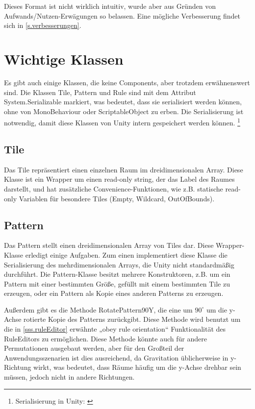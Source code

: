 Dieses Format ist nicht wirklich intuitiv, wurde aber aus Gründen von Aufwands/Nutzen-Erwägungen so belassen. Eine mögliche Verbesserung findet sich in \ref{s.verbesserungen}.

\section{Wichtige Klassen}

Es gibt auch einige Klassen, die keine Components, aber trotzdem erwähnenswert sind. Die Klassen Tile, Pattern und Rule sind mit dem Attribut System.Serializable markiert, was bedeutet, dass sie serialisiert werden können, ohne von MonoBehaviour oder ScriptableObject zu erben. Die Serialisierung ist notwendig, damit diese Klassen von Unity intern gespeichert werden können. 
\footnote{Serialisierung in Unity: \cite[Seite: script-Serialization]{unityManual}}

\subsection{Tile}

Das Tile repräsentiert einen einzelnen Raum im dreidimensionalen Array. Diese Klasse ist ein Wrapper um einen read-only string, der das Label des Raumes darstellt, und hat zusätzliche Convenience-Funktionen, wie z.B. statische read-only Variablen für besondere Tiles (Empty, Wildcard, OutOfBounds).

\subsection{Pattern}

Das Pattern stellt einen dreidimensionalen Array von Tiles dar. Diese Wrapper-Klasse erledigt einige Aufgaben. Zum einen implementiert diese Klasse die Serialisierung des mehrdimensionalen Arrays, die Unity nicht standardmäßig durchführt. Die Pattern-Klasse besitzt mehrere Konstruktoren, z.B. um ein Pattern mit einer bestimmten Größe, gefüllt mit einem bestimmten Tile zu erzeugen, oder ein Pattern als Kopie eines anderen Patterns zu erzeugen. 

Außerdem gibt es die Methode RotatePattern90Y, die eine um $ 90^\circ $ um die y-Achse rotierte Kopie des Patterns zurückgibt. Diese Methode wird benutzt um die in \ref{sss.ruleEditor} erwähnte „obey rule orientation“ Funktionalität des RuleEditors zu ermöglichen. Diese Methode könnte auch für andere Permutationen ausgebaut werden, aber für den Großteil der Anwendungsszenarien ist dies ausreichend, da Gravitation üblicherweise in y-Richtung wirkt, was bedeutet, dass Räume häufig um die y-Achse drehbar sein müssen, jedoch nicht in andere Richtungen.

